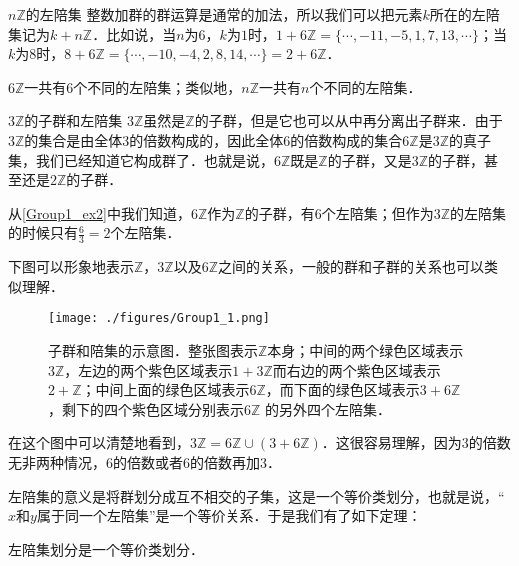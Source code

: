 \begin{example}{$n\mathbb{Z}的左陪集$}\label{Group1_ex2}
整数加群的群运算是通常的加法，所以我们可以把元素$k$所在的左陪集记为$k+n\mathbb{Z}$．比如说，当$n$为$6$，$k$为$1$时，$1+6\mathbb{Z}=\{\cdots, -11, -5, 1, 7, 13, \cdots\}$；当$k$为$8$时，$8+6\mathbb{Z}=\{\cdots, -10, -4, 2, 8, 14, \cdots\}=2+6\mathbb{Z}$．

$6\mathbb{Z}$一共有$6$个不同的左陪集；类似地，$n\mathbb{Z}$一共有$n$个不同的左陪集．


\end{example}

\begin{example}{$3\mathbb{Z}$的子群和左陪集}\label{Group1_ex3}
$3\mathbb{Z}$虽然是$\mathbb{Z}$的子群，但是它也可以从中再分离出子群来．由于$3\mathbb{Z}$的集合是由全体$3$的倍数构成的，因此全体$6$的倍数构成的集合$6\mathbb{Z}$是$3\mathbb{Z}$的真子集，我们已经知道它构成群了．也就是说，$6\mathbb{Z}$既是$\mathbb{Z}$的子群，又是$3\mathbb{Z}$的子群，甚至还是$2\mathbb{Z}$的子群．

从\autoref{Group1_ex2}中我们知道，$6\mathbb{Z}$作为$\mathbb{Z}$的子群，有$6$个左陪集；但作为$3\mathbb{Z}$的左陪集的时候只有$\frac{6}{3}=2$个左陪集．

下图可以形象地表示$\mathbb{Z}$，$3\mathbb{Z}$以及$6\mathbb{Z}$之间的关系，一般的群和子群的关系也可以类似理解．

\begin{figure}[ht]
\centering
\texttt{[image: ./figures/Group1\_1.png]}
\caption{子群和陪集的示意图．整张图表示$\mathbb{Z}$本身；中间的两个绿色区域表示$3\mathbb{Z}$，左边的两个紫色区域表示$1+3\mathbb{Z}$而右边的两个紫色区域表示$2+\mathbb{Z}$；中间上面的绿色区域表示$6\mathbb{Z}$，而下面的绿色区域表示$3+6\mathbb{Z}$，剩下的四个紫色区域分别表示$6\mathbb{Z}$ 的另外四个左陪集．} \label{Group1_fig1}
\end{figure}

在这个图中可以清楚地看到，$3\mathbb{Z}=6\mathbb{Z}\cup(3+6\mathbb{Z})$．这很容易理解，因为$3$的倍数无非两种情况，$6$的倍数或者$6$的倍数再加$3$．

\end{example}

左陪集的意义是将群划分成互不相交的子集，这是一个等价类划分，也就是说，“$x$和$y$属于同一个左陪集”是一个等价关系．于是我们有了如下定理： 

\begin{theorem}{}\label{Group1_the1}

左陪集划分是一个等价类划分．

\end{theorem}

